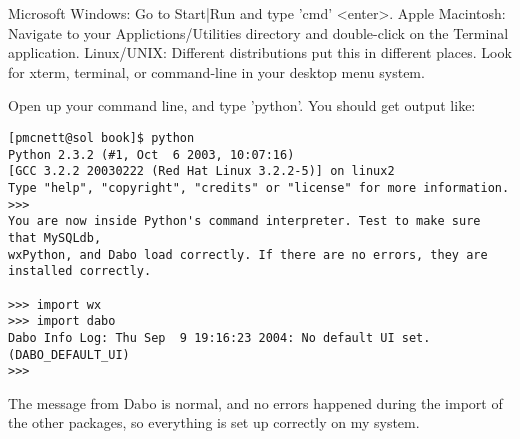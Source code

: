 Microsoft Windows: Go to Start|Run and type 'cmd' <enter>.
Apple Macintosh: Navigate to your Applictions/Utilities directory and double-click on the Terminal application.
Linux/UNIX: Different distributions put this in different places. Look for xterm, terminal, or command-line in your desktop menu system.
	
Open up your command line, and type 'python'. You should get output like:	%
\begin{verbatim}
[pmcnett@sol book]$ python
Python 2.3.2 (#1, Oct  6 2003, 10:07:16)
[GCC 3.2.2 20030222 (Red Hat Linux 3.2.2-5)] on linux2
Type "help", "copyright", "credits" or "license" for more information.
>>>
You are now inside Python's command interpreter. Test to make sure that MySQLdb,
wxPython, and Dabo load correctly. If there are no errors, they are installed correctly.

>>> import wx
>>> import dabo
Dabo Info Log: Thu Sep  9 19:16:23 2004: No default UI set. (DABO_DEFAULT_UI)
>>>
\end{verbatim}
The message from Dabo is normal, and no errors happened during the import of the other packages, so everything is set up correctly on my system. 
